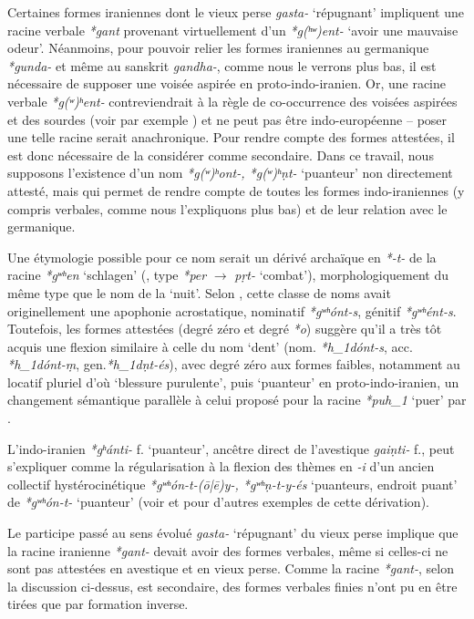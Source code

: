 \documentclass[11pt]{article}
\newcommand{\ipa}[1]{{\phon\textit{#1}}}
\begin{document}
Certaines formes iraniennes dont le vieux perse \ipa{gasta-} `répugnant' impliquent une racine verbale \ipa{*gant} provenant virtuellement d'un \ipa{*g(ʰʷ)ent-} `avoir une mauvaise odeur'. Néanmoins, pour pouvoir relier les formes iraniennes au germanique \ipa{*gunda-} et même au sanskrit \ipa{gandha-}, comme nous le verrons plus bas, il est nécessaire de supposer une voisée aspirée en proto-indo-iranien. Or, une racine verbale \ipa{*g(ʷ)ʰent-} contreviendrait à la règle de co-occurrence des voisées aspirées et des sourdes (voir par exemple \citealt{kuemmel12pie}) et ne peut pas être indo-européenne -- poser une telle racine serait anachronique. Pour rendre compte des formes attestées, il est donc nécessaire de la considérer comme secondaire. Dans ce travail, nous supposons l'existence d'un nom \ipa{*g(ʷ)ʰont-, *g(ʷ)ʰṇt-} `puanteur' non directement attesté, mais qui permet de rendre compte de toutes les formes indo-iraniennes (y compris verbales, comme nous l'expliquons plus bas) et de leur relation avec le germanique.

Une étymologie possible pour ce nom serait un dérivé  archaïque en \ipa{*-t-} de la racine \ipa{*gʷʰen} `schlagen' (\citealt[218]{liv}, type \ipa{*per} $\rightarrow$ \ipa{pṛt-} `combat'), morphologiquement du même type que le nom de la `nuit'. Selon \citet{schindler67nekuz}, cette classe de noms avait originellement une apophonie acrostatique, nominatif \ipa{*gʷʰónt-s}, génitif \ipa{*gʷʰént-s}. Toutefois, les formes attestées (degré zéro et degré \ipa{*o}) suggère qu'il a très tôt acquis une flexion similaire à celle du nom `dent' (nom. \ipa{*h_1dónt-s}, acc. \ipa{*h_1dónt-ṃ}, gen.\ipa{*h_1dṇt-és}), avec degré zéro aux formes faibles, notamment au locatif pluriel d'où `blessure purulente', puis `puanteur' en proto-indo-iranien, un changement sémantique parallèle à celui proposé pour la racine \ipa{*puh_1} `puer' par \citet{garnier16secondary}.
 
L'indo-iranien \ipa{*gʰánti-} f. `puanteur', ancêtre direct de l'avestique \ipa{gaiṇti-} f., peut s'expliquer comme la régularisation à la flexion des thèmes en \ipa{-i} d'un ancien collectif hystérocinétique \ipa{*gʷʰón-t-(ō|ē)y-, *gʷʰṇ-t-y-és} `puanteurs, endroit puant' de  \ipa{*gʷʰón-t-} `puanteur' (voir \citealt{oettinger95kollektiv} et \citealt{ garnier13ghosti} pour d'autres exemples de cette dérivation).

Le participe passé au sens évolué \ipa{gasta-} `répugnant' du vieux perse implique que la racine iranienne \ipa{*gant-} devait avoir des formes verbales, même si celles-ci ne sont pas attestées en avestique et en vieux perse. Comme la racine \ipa{*gant-}, selon la discussion ci-dessus, est secondaire, des formes verbales finies n'ont pu en être tirées que par formation inverse. 
\end{document}
